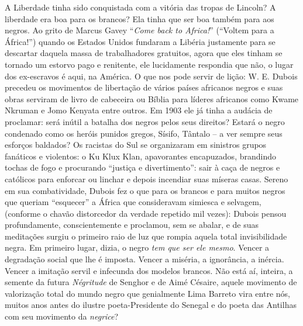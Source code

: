 \documentclass[
  letterpaper,
  DIV=11,
  numbers=noendperiod]{scrreprt}
\begin{document}
A Liberdade tinha sido conquistada com a vitória das tropas de Lincoln?
A liberdade era boa para os brancos? Ela tinha que ser boa também para
aos negros. Ao grito de Marcus Gavey ``\emph{Come back to Africa!}''
(``Voltem para a África!'') quando os Estados Unidos fundaram a Libéria
justamente para se descartar daquela massa de trabalhadores gratuitos,
agora que eles tinham se tornado um estorvo pago e renitente, ele
lucidamente respondia que não, o lugar dos ex-escravos é aqui, na
América. O que nos pode servir de lição: W. E. Dubois precedeu os
movimentos de libertação de vários países africanos negros e suas obras
serviram de livro de cabeceira ou Bíblia para líderes africanos como
Kwame Nkruman e Jomo Kenyata entre outros. Em 1903 ele já tinha a
audácia de proclamar: será inútil a batalha dos negros pelos seus
direitos? Estará o negro condenado como os heróis punidos gregos,
Sísifo, Tântalo -- a ver sempre seus esforços baldados? Os racistas do
Sul se organizaram em sinistros grupos fanáticos e violentos: o Ku Klux
Klan, apavorantes encapuzados, brandindo tochas de fogo e procurando
``justiça e divertimento'': sair à caça de negros e católicos para
enforcar ou linchar e depois incendiar suas míseras casas. Sereno em sua
combatividade, Dubois fez o que para os brancos e para muitos negros que
queriam ``esquecer'' a África que consideravam simiesca e selvagem,
(conforme o chavão distorcedor da verdade repetido mil vezes): Dubois
pensou profundamente, conscientemente e proclamou, sem se abalar, e de
suas meditações surgiu o primeiro raio de luz que rompia aquela total
invisibilidade negra. Em primeiro lugar, dizia, o negro \emph{tem que
ser ele mesmo}. Vencer a degradação social que lhe é imposta. Vencer a
miséria, a ignorância, a inércia. Vencer a imitação servil e infecunda
dos modelos brancos. Não está aí, inteira, a semente da futura
\emph{Négritude} de Senghor e de Aimé Césaire, aquele movimento de
valorização total do mundo negro que genialmente Lima Barreto vira entre
nós, muitos anos antes do ilustre poeta-Presidente do Senegal e do poeta
das Antilhas com seu movimento da \emph{negrice}?
\end{document}

